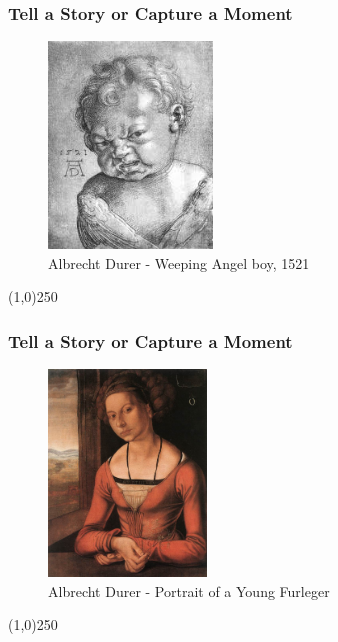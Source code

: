 \begin{frame}
\frametitle{Tell a Story or Capture a Moment}
\begin{figure}
	\centering
		\includegraphics[height=5.5cm]{img/candc/DurerAngelBoy.jpg}
	\caption{Albrecht Durer - Weeping Angel boy, 1521}
	\label{fig:DurerAngelBoy}
\end{figure}
\end{frame}
\begin{center}\line(1,0){250}\end{center}




\begin{frame}
\frametitle{Tell a Story or Capture a Moment}
\begin{figure}
	\centering
		\includegraphics[height=5.5cm]{img/candc/Durerfurleger.jpg}
	\caption{Albrecht Durer - Portrait of a Young Furleger}
	\label{fig:DurerYoungFurleger}
\end{figure}
\end{frame}
\begin{center}\line(1,0){250}\end{center}




